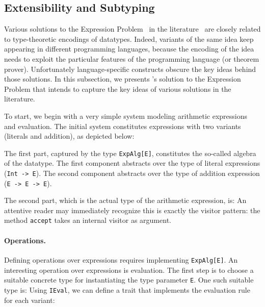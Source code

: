 \subsection{Extensibility and Subtyping}
\label{sec:extensibility}

Various solutions to the Expression Problem~\cite{wadler1998expression} in the
literature~\cite{finally-tagless,oliveira09modular,DelawareOS13,oliveira2012extensibility,
  swierstra:la-carte} are closely related to type-theoretic encodings of
datatypes. Indeed, variants of the same idea keep appearing in different
programming languages, because the encoding of the idea needs to exploit the
particular features of the programming language (or theorem prover).
Unfortunately language-specific constructs obscure the key ideas behind those
solutions. In this subsection, we presents \name's solution to the Expression
Problem that intends to capture the key ideas of various solutions in the
literature.

To start, we begin with a very simple system modeling arithmetic expressions and
evaluation. The initial system constitutes expressions with two variants
(literals and addition), as depicted below:

The first part, captured by the type \lstinline{ExpAlg[E]}, constitutes the
so-called algebra of the datatype. The first component abstracts over the type
of literal expressions (\lstinline{Int -> E}). The second component abstracts
over the type of addition expression (\lstinline{E -> E -> E}).

The second part, which is the actual type of the arithmetic expression, is:
An attentive reader may immediately recognize this is exactly the visitor
pattern: the method \lstinline{accept} takes an internal visitor as argument.



\paragraph{Operations.} Defining operations over expressions requires
implementing \lstinline{ExpAlg[E]}. An interesting operation over expressions is
evaluation. The first step is to choose a suitable concrete type for
instantiating the type parameter \lstinline{E}. One such suitable type is:
Using \lstinline{IEval}, we can define a trait that implements the evaluation
rule for each variant:


